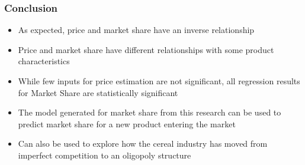 \documentclass{beamer}
\begin{document}
\begin{frame}
\frametitle{Conclusion}

\begin{itemize}
 \item As expected, price and market share have an inverse relationship
 \item Price and market share have different relationships with some product characteristics 
 \item While few inputs for price estimation are not significant, all regression results for Market Share are statistically significant
 \item The model generated for market share from this research can be used to predict market share for a new product entering the market
 \item Can also be used to explore how the cereal industry has moved from imperfect competition to an oligopoly structure

\end{itemize}

\end{frame}
\end{document}
